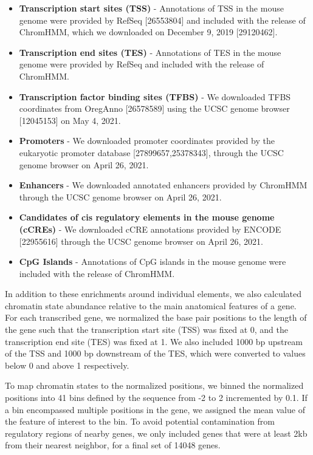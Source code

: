 \documentclass[10pt,letterpaper]{article}
\providecommand{\tightlist}{%
  \setlength{\itemsep}{0pt}\setlength{\parskip}{0pt}}
\begin{document}
\begin{itemize}
\tightlist
\item
  \textbf{Transcription start sites (TSS)} - Annotations of TSS in the
  mouse genome were provided by RefSeq {[}26553804{]} and included with
  the release of ChromHMM, which we downloaded on December 9, 2019
  {[}29120462{]}.
\item
  \textbf{Transcription end sites (TES)} - Annotations of TES in the
  mouse genome were provided by RefSeq and included with the release of
  ChromHMM.
\item
  \textbf{Transcription factor binding sites (TFBS)} - We downloaded
  TFBS coordinates from OregAnno {[}26578589{]} using the UCSC genome
  browser {[}12045153{]} on May 4, 2021.
\item
  \textbf{Promoters} - We downloaded promoter coordinates provided by
  the eukaryotic promoter database {[}27899657,25378343{]}, through the
  UCSC genome browser on April 26, 2021.
\item
  \textbf{Enhancers} - We downloaded annotated enhancers provided by
  ChromHMM through the UCSC genome browser on April 26, 2021.
\item
  \textbf{Candidates of cis regulatory elements in the mouse genome
  (cCREs)} - We downloaded cCRE annotations provided by ENCODE
  {[}22955616{]} through the UCSC genome browser on April 26, 2021.
\item
  \textbf{CpG Islands} - Annotations of CpG islands in the mouse genome
  were included with the release of ChromHMM.
\end{itemize}

In addition to these enrichments around individual elements, we also
calculated chromatin state abundance relative to the main anatomical
features of a gene. For each transcribed gene, we normalized the base
pair positions to the length of the gene such that the transcription
start site (TSS) was fixed at 0, and the transcription end site (TES)
was fixed at 1. We also included 1000 bp upstream of the TSS and 1000 bp
downstream of the TES, which were converted to values below 0 and above
1 respectively.

To map chromatin states to the normalized positions, we binned the
normalized positions into 41 bins defined by the sequence from -2 to 2
incremented by 0.1. If a bin encompassed multiple positions in the gene,
we assigned the mean value of the feature of interest to the bin. To
avoid potential contamination from regulatory regions of nearby genes,
we only included genes that were at least 2kb from their nearest
neighbor, for a final set of 14048 genes.
\end{document}
